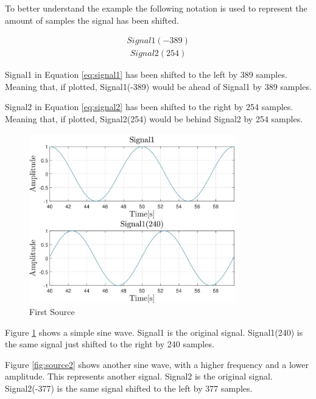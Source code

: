 To better understand the example the following notation is
used to represent the amount of samples the signal has been shifted. 

\begin{align}
	Signal1(-389)
	\label{eq:signal1}
\end{align}
\begin{align}
	Signal2(254)
	\label{eq:signal2}
\end{align}

Signal1 in Equation \ref{eq:signal1} has been shifted to the left by 389 samples. Meaning that, if 
plotted, Signal1(-389) would be ahead of Signal1 by 389 samples.

Signal2 in Equation \ref{eq:signal2} has been shifted to the right by 254 samples. Meaning that, if 
plotted, Signal2(254) would be behind Signal2 by 254 samples.

\begin{figure}[htp]
	\centering
	\includegraphics[width=0.8\textwidth]{Illustrations/source1.jpg}
	\caption{First Source}
	\label{fig:source1}
\end{figure}

Figure \ref{fig:source1} shows a simple sine wave. Signal1 is the original signal. Signal1(240) is the 
same signal just shifted to the right by 240 samples.
\newpage

Figure \ref{fig:source2} shows another sine wave, with a higher frequency and a lower amplitude. This 
represents another signal. Signal2 is the original signal. Signal2(-377) is the same signal shifted to 
the left by 377 samples.

